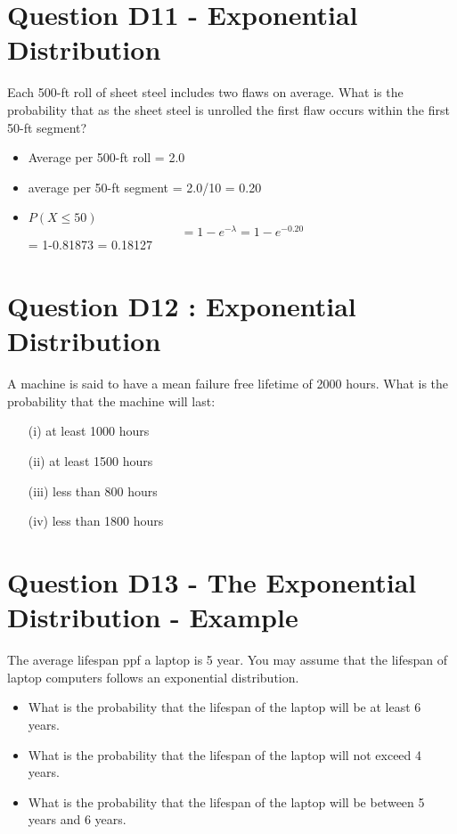\documentclass[]{report}
\begin{document}

\section*{Question D11 - Exponential Distribution}
Each 500-ft roll of sheet steel includes two flaws on average. 
What is the probability that as the sheet steel is unrolled the first flaw occurs within the first 50-ft segment?


\begin{itemize}
	\item Average per 500-ft roll = 2.0
	\item average per 50-ft segment = 2.0/10 = 0.20
	\item $P(X \leq 50)$
	\[ = 1 - e^{-\lambda} = 1 - e^{-0.20}\] = 1-0.81873 = 0.18127
\end{itemize}


\section{Question D12 : Exponential Distribution}

A machine is said to have a mean failure free lifetime of 2000 hours. What is the probability that the machine will last:

\begin{itemize}
	\item[(i)]	at least 1000 hours
	\item[(ii)]	at least 1500 hours
	\item[(iii)]	less than 800 hours
	\item[(iv)]	less than 1800 hours
\end{itemize}
\section{Question D13 -  The Exponential Distribution - Example}
The average lifespan ppf a laptop is 5 year. You may assume that the lifespan of laptop computers follows an exponential distribution.
\begin{itemize}
	\item What is the probability that the lifespan of the laptop will be at least 6 years.
	\item What is the probability that the lifespan of the laptop will not exceed 4 years.
	\item What is the probability that the lifespan of the laptop will be between 5 years and 6 years.
\end{itemize}
\end{document}
